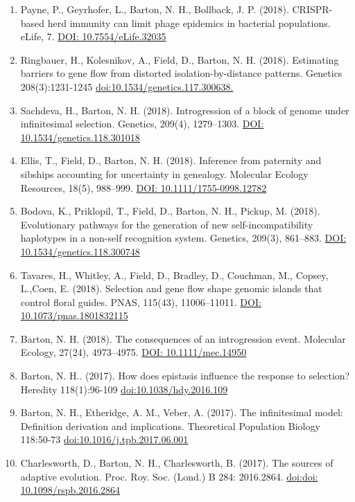 \documentclass[10pt]{article}
\begin{document}
\begin{cv}
\begin{enumerate}
\item Payne, P., Geyrhofer, L., Barton, N. H., Bollback, J. P. (2018). CRISPR-based herd immunity can limit phage epidemics in bacterial populations. eLife, 7.
\href{https://research-explorer.app.ist.ac.at/record/423}{DOI: 10.7554/eLife.32035}
\item Ringbauer, H., Kolesnikov, A., Field, D., Barton, N. H. (2018). Estimating barriers to gene flow from distorted isolation-by-distance patterns. Genetics 208(3):1231-1245 
\href{http://dx.doi.org/10.1534/genetics.117.300638.}{doi:10.1534/genetics.117.300638.}
\item Sachdeva, H., Barton, N. H. (2018). Introgression of a block of genome under infinitesimal selection. Genetics, 209(4), 1279–1303. 
\href{https://research-explorer.app.ist.ac.at/record/282}{DOI: 10.1534/genetics.118.301018}
\item Ellis, T., Field, D., Barton, N. H. (2018). Inference from paternity and sibships accounting for uncertainty in genealogy. Molecular Ecology Resources, 18(5), 988–999.
\href{https://research-explorer.app.ist.ac.at/record/396}{DOI: 10.1111/1755-0998.12782}
\item Bodova, K., Priklopil, T., Field, D., Barton, N. H., Pickup, M. (2018). Evolutionary pathways for the generation of new self-incompatibility haplotypes in a non-self recognition system. Genetics, 209(3), 861–883.
\href{https://research-explorer.app.ist.ac.at/record/316}{DOI: 10.1534/genetics.118.300748}
\item Tavares, H., Whitley, A., Field, D., Bradley, D., Couchman, M., Copsey, L.,Coen, E. (2018). Selection and gene flow shape genomic islands that control floral guides. PNAS, 115(43), 11006–11011.
\href{https://research-explorer.app.ist.ac.at/record/38}{DOI: 10.1073/pnas.1801832115}
\item Barton, N. H. (2018). The consequences of an introgression event. Molecular Ecology, 27(24), 4973–4975.
\href{https://research-explorer.app.ist.ac.at/record/40}{DOI: 10.1111/mec.14950}
\item Barton, N. H.. (2017). How does epistasis influence the response to selection? Heredity 118(1):96-109
\href{http://dx.doi.org/10.1038/hdy.2016.109}{doi:10.1038/hdy.2016.109}
\item Barton, N. H., Etheridge, A. M., Veber, A. (2017). The infinitesimal model: Definition derivation and implications. Theoretical Population Biology 118:50-73 
\href{http://dx.doi.org/10.1016/j.tpb.2017.06.001}{doi:10.1016/j.tpb.2017.06.001}
\item Charlesworth, D., Barton, N. H., Charlesworth, B. (2017). The sources of adaptive evolution. Proc. Roy. Soc. (Lond.) B 284: 2016.2864. \href{http://dx.doi.org/doi: 10.1098/rspb.2016.2864}{doi:doi: 10.1098/rspb.2016.2864}

\end{enumerate}
\end{cv}
\end{document}
